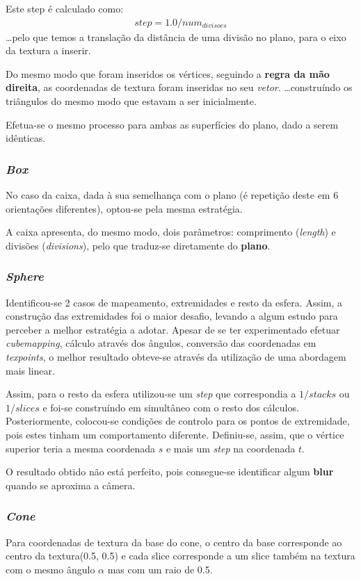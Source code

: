 \documentclass[relatorio.tex]{subfiles}
\begin{document}
Este step é calculado como:
\begin{eqnarray}
    step = 1.0 / num_{divisoes}
\end{eqnarray}
\dots pelo que temos a translação da distância de uma
divisão no plano, para o eixo da textura a inserir.

Do mesmo modo que foram inseridos os vértices,
seguindo a \textbf{regra da mão direita}, 
as coordenadas de textura foram inseridas no seu \textit{vetor}.
\dots construíndo os triângulos do mesmo 
modo que estavam a ser inicialmente.

Efetua-se o mesmo processo para ambas as 
superfícies do plano, dado a serem 
idênticas.

\subsubsection{\textit{Box}}

No caso da caixa, dada à sua semelhança com o plano 
(é repetição deste em 6 orientações diferentes),
optou-se pela mesma estratégia.

A caixa apresenta, do mesmo modo, dois parâmetros: comprimento (\textit{length})
e divisões (\textit{divisions}), pelo que traduz-se 
diretamente do \textbf{plano}.

\subsubsection{\textit{Sphere}}
Identificou-se 2 casos de mapeamento, extremidades e resto da esfera.
Assim, a construção das extremidades foi o maior desafio, levando a algum estudo
para perceber a melhor estratégia a adotar.
Apesar de se ter experimentado efetuar \textit{cubemapping}, cálculo através 
dos ângulos, conversão das coordenadas em \textit{texpoints}, o melhor resultado
obteve-se através da utilização de uma abordagem mais linear.

Assim, para o resto da esfera utilizou-se um \textit{step} que correspondia a
$1 / stacks$ ou $1 / slices$ e foi-se construíndo em simultâneo com o resto
dos cálculos.
Posteriormente, colocou-se condições de controlo para os pontos de extremidade, pois
estes tinham um comportamento diferente.
Definiu-se, assim, que o vértice superior teria a mesma coordenada $s$ e mais um
\textit{step} na coordenada $t$.

O resultado obtido não está perfeito, pois consegue-se identificar algum \textbf{blur}
quando se aproxima a câmera.

\subsubsection{\textit{Cone}}
Para coordenadas de textura da base do cone, o centro da base
corresponde ao centro da textura(0.5, 0.5) e cada slice corresponde
a um slice também na textura com o mesmo ângulo $\alpha$ mas com um raio
de 0.5.
\end{document}
